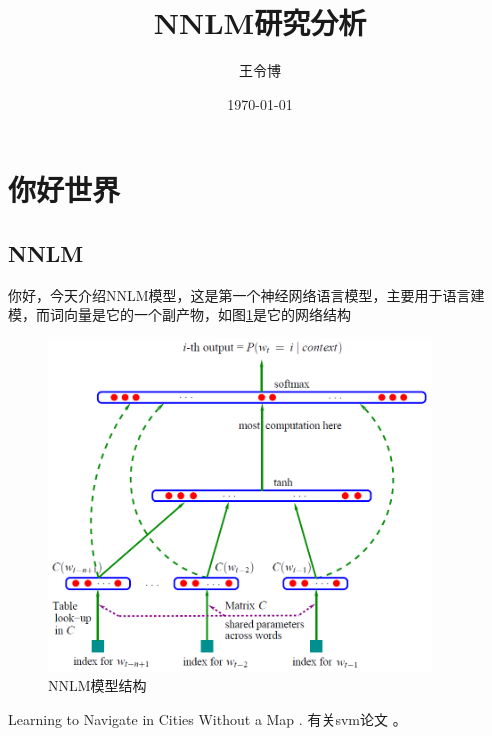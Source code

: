\documentclass[a4paper,UTF8]{ctexart}
\title{NNLM研究分析}
\author{王令博}
\date{\today}
\begin{document}
    \maketitle
    \section{你好世界}
    \subsection{NNLM}
    你好，今天介绍NNLM模型，这是第一个神经网络语言模型，主要用于语言建模，而词向量是它的一个副产物，如图\ref{fig:NNLM}是它的网络结构
    \begin{figure}[!t]
        \centering
        \includegraphics[width=4in]{img/NNLM.jpg}
        \caption{NNLM模型结构}
        \label{fig:NNLM}
    \end{figure}
    Learning to Navigate in Cities Without a Map \cite{mirowski2018learning}.
    有关svm论文 \cite{2007LIBSVM}。
    
    
    
\end{document}
